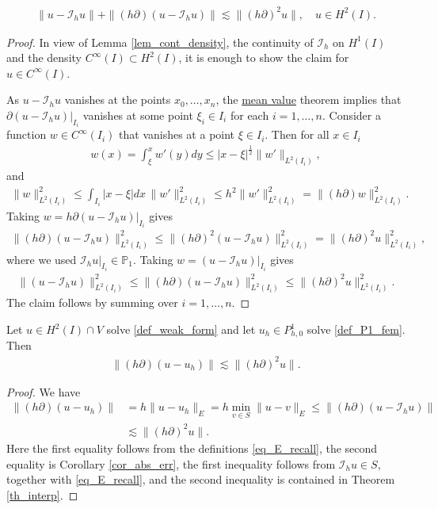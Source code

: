 \documentclass[12pt,oneside,final]{amsart}
\def\p{\partial}
\def\I{\mathcal I}
\begin{document}
\begin{theorem}\label{th_interp}
    \begin{align*}
\|u - \I_h u\| + \|(h\p)(u - \I_h u)\| \lesssim \|(h\p)^2 u\|, 
\quad u \in H^2(I). 
    \end{align*}
\end{theorem}
\begin{proof}
In view of Lemma \ref{lem_cont_density},
the continuity of $\I_h$ on $H^1(I)$ and the density $C^\infty(I) \subset H^2(I)$, it is enough to show the claim for $u \in C^\infty(I)$.

As $u - \I_h u$ vanishes at the points $x_0, \dots, x_n$,
the \href{https://en.wikipedia.org/wiki/Mean_value_theorem}{mean value} theorem implies that $\p (u - \I_h u)|_{I_i}$ vanishes at some point $\xi_i \in I_i$ for each $i=1,\dots,n$.
Consider a function $w \in C^\infty(I_i)$ that vanishes at a point $\xi \in I_i$. Then for all $x \in I_i$
    \begin{align*}
w(x) = \int_\xi^x w'(y) dy \le |x - \xi|^{\frac12} \|w'\|_{L^2(I_i)},
    \end{align*}
and
    \begin{align*}
\|w\|_{L^2(I_i)}^2 \le \int_{I_i} |x - \xi| dx\, \|w'\|_{L^2(I_i)}^2
\le h^2 \|w'\|_{L^2(I_i)}^2 = \|(h\p) w\|_{L^2(I_i)}^2.
    \end{align*}
Taking $w = h\p (u - \I_h u)|_{I_i}$ gives 
    \begin{align*}
\|(h\p)(u - \I_h u)\|_{L^2(I_i)}^2 
\le 
\|(h\p)^2 (u - \I_h u)\|_{L^2(I_i)}^2
= 
\|(h\p)^2 u\|_{L^2(I_i)}^2,
    \end{align*}
where we used $\I_h u|_{I_i} \in \mathbb P_1$.
Taking $w = (u - \I_h u)|_{I_i}$ gives
    \begin{align*}
\|(u - \I_h u)\|_{L^2(I_i)}^2 
\le 
\|(h\p)(u - \I_h u)\|_{L^2(I_i)}^2
\le 
\|(h\p)^2 u\|_{L^2(I_i)}^2.
    \end{align*}
The claim follows by summing over $i=1,\dots,n$.
\end{proof}

\begin{theorem}\label{th_err_deriv}
Let $u \in H^2(I) \cap V$ solve \eqref{def_weak_form}
and let $u_h \in P_{h,0}^1$ solve \eqref{def_P1_fem}.
Then
    \begin{align*}
\|(h\partial)(u-u_h)\|
\lesssim
\|(h \partial)^2 u\|.
    \end{align*}
\end{theorem}
\begin{proof}
We have
    \begin{align*}
\|(h\partial)(u-u_h)\|
&= 
h\|u-u_h\|_E 
= 
h \min_{v \in S}\|u-v\|_E
\le 
\|(h\partial)(u-\I_h u)\|
\\&\lesssim
\|(h \partial)^2 u\|.
    \end{align*}
Here the first equality follows from the definitions \eqref{eq_E_recall},
the second equality is Corollary \ref{cor_abs_err},
the first inequality follows from $\I_h u \in S$, together with \eqref{eq_E_recall}, and the second inequality is contained in Theorem \ref{th_interp}. 
\end{proof}
\end{document}
